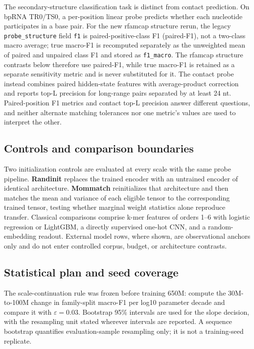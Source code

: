 The secondary-structure classification task is distinct from contact prediction. On bpRNA TR0/TS0, a per-position linear probe predicts whether each nucleotide participates in a base pair. For the new rfamcap structure rerun, the legacy \texttt{probe\_structure} field \texttt{f1} is paired-positive-class F1 (paired-F1), not a two-class macro average; true macro-F1 is recomputed separately as the unweighted mean of paired and unpaired class F1 and stored as \texttt{f1\_macro}. The rfamcap structure contrasts below therefore use paired-F1, while true macro-F1 is retained as a separate sensitivity metric and is never substituted for it. The contact probe instead combines paired hidden-state features with average-product correction and reports top-L precision for long-range pairs separated by at least 24 nt. Paired-position F1 metrics and contact top-L precision answer different questions, and neither alternate matching tolerances nor one metric's values are used to interpret the other.

\hypertarget{controls-and-comparison-boundaries}{%
\subsection{Controls and comparison boundaries}\label{controls-and-comparison-boundaries}}

Two initialization controls are evaluated at every scale with the same probe pipeline. \textbf{Randinit} replaces the trained encoder with an untrained encoder of identical architecture. \textbf{Mommatch} reinitializes that architecture and then matches the mean and variance of each eligible tensor to the corresponding trained tensor, testing whether marginal weight statistics alone reproduce transfer. Classical comparisons comprise k-mer features of orders 1--6 with logistic regression or LightGBM, a directly supervised one-hot CNN, and a random-embedding readout. External model rows, where shown, are observational anchors only and do not enter controlled corpus, budget, or architecture contrasts.

\hypertarget{statistical-plan-and-seed-coverage}{%
\subsection{Statistical plan and seed coverage}\label{statistical-plan-and-seed-coverage}}

The scale-continuation rule was frozen before training 650M: compute the 30M-to-100M change in family-split macro-F1 per log10 parameter decade and compare it with \(\varepsilon=0.03\). Bootstrap 95\% intervals are used for the slope decision, with the resampling unit stated wherever intervals are reported. A sequence bootstrap quantifies evaluation-sample resampling only; it is not a training-seed replicate.

